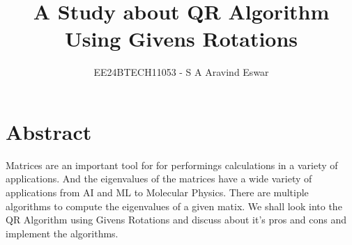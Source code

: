 \documentclass[journal]{IEEEtran}
\numberwithin{equation}{section}
\begin{document}

\vspace{5cm}

\title{A Study about QR Algorithm Using Givens Rotations}
\author{EE24BTECH11053 - S A Aravind Eswar
}
\begin{titlingpage}
\maketitle
\end{titlingpage}

\renewcommand{\thefigure}{\theenumi}
\renewcommand{\thetable}{\theenumi}
\setlength{\intextsep}{15pt} %


\renewcommand{\thetable}{\theenumi}


\tableofcontents
\newpage

\section{Abstract}

Matrices are an important tool for for performings calculations in a variety of applications. And the eigenvalues of the matrices have a wide variety of applications from AI and ML to Molecular Physics. There are multiple algorithms to compute the eigenvalues of a given matix. We shall look into the QR Algorithm using Givens Rotations and discuss about it's pros and cons and implement the algorithms.
\end{document}
